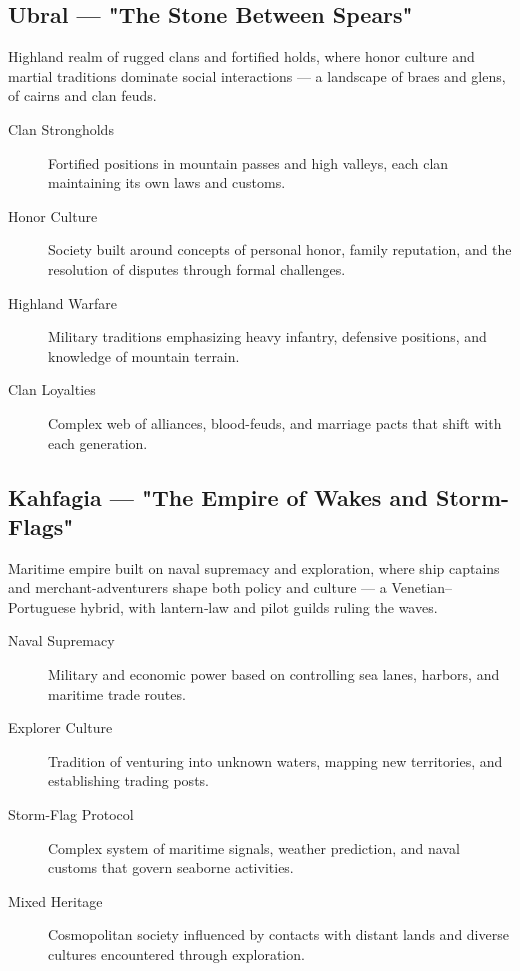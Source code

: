 \subsection*{Ubral — "The Stone Between Spears"}

Highland realm of rugged clans and fortified holds, where honor culture and martial traditions dominate social interactions — a landscape of braes and glens, of cairns and clan feuds.

\begin{description}
\item[Clan Strongholds] Fortified positions in mountain passes and high valleys, each clan maintaining its own laws and customs.
\item[Honor Culture] Society built around concepts of personal honor, family reputation, and the resolution of disputes through formal challenges.
\item[Highland Warfare] Military traditions emphasizing heavy infantry, defensive positions, and knowledge of mountain terrain.
\item[Clan Loyalties] Complex web of alliances, blood-feuds, and marriage pacts that shift with each generation.
\end{description}

\subsection*{Kahfagia — "The Empire of Wakes and Storm-Flags"}

Maritime empire built on naval supremacy and exploration, where ship captains and merchant-adventurers shape both policy and culture — a Venetian–Portuguese hybrid, with lantern‑law and pilot guilds ruling the waves.

\begin{description}
\item[Naval Supremacy] Military and economic power based on controlling sea lanes, harbors, and maritime trade routes.
\item[Explorer Culture] Tradition of venturing into unknown waters, mapping new territories, and establishing trading posts.
\item[Storm-Flag Protocol] Complex system of maritime signals, weather prediction, and naval customs that govern seaborne activities.
\item[Mixed Heritage] Cosmopolitan society influenced by contacts with distant lands and diverse cultures encountered through exploration.
\end{description}

